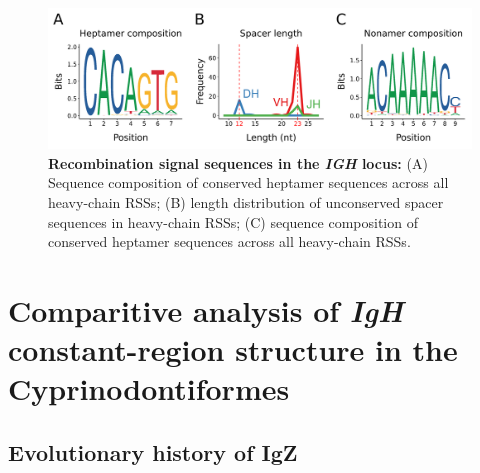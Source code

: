 	\begin{figure}
		\begin{subfigure}{0em}
        \label{fig:xma-rss-seqlogo-all-heptamer}
    \end{subfigure}
    \begin{subfigure}{0em}
        \label{fig:xma-rss-seqlogo-all-spacer}
    \end{subfigure}
    \begin{subfigure}{0em}
        \label{fig:xma-rss-seqlogo-all-nonamer}
    \end{subfigure}
	\includegraphics[width=\textwidth]{_Figures/png/xma-rss-seqlogo-all}
	\caption[Recombination signal sequences in the \Xma \textit{IGH} locus]{\textbf{Recombination signal sequences in the \Xma \textit{IGH} locus:} (A) Sequence composition of conserved heptamer sequences across all \Xma heavy-chain RSSs; (B) length distribution of unconserved spacer sequences in \Xma heavy-chain RSSs; (C) sequence composition of conserved heptamer sequences across all \Xma heavy-chain RSSs.}
	\label{fig:xma-rss-seqlogo-all}
	\end{figure}



\section{Comparitive analysis of \textit{IgH} constant-region structure in the Cyprinodontiformes}
\label{sec:comparative-loci}

	\subsection{Evolutionary history of IgZ}
	
